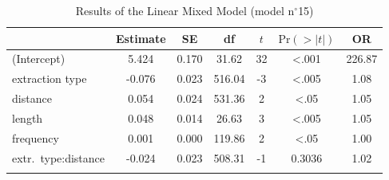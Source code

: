 \begin{table}
\begin{tabularx}{\textwidth}{Q 
                  S[table-format=-1.3] 
                  S[table-format=1.3] 
                  S[table-format=3.2] 
                  S[table-format=-1] 
                  S[table-format=<1.4] 
                  S[table-format=3.2]}
  \lsptoprule
 & {Estimate} & {SE} & {df} & {$t$} & {$\text{Pr}(>|t|)$} & {OR} \\ 
  \midrule
(Intercept) & 5.424 & 0.170 & 31.62 & 32 & <.001 & 226.87 \\ 
  extraction type & -0.076 & 0.023 & 516.04 & -3 & <.005 & 1.08 \\ 
  distance & 0.054 & 0.024 & 531.36 & 2 & <.05 & 1.05 \\ 
  length & 0.048 & 0.014 & 26.63 & 3 & <.005 & 1.05 \\ 
  frequency & 0.001 & 0.000 & 119.86 & 2 & <.05 & 1.00 \\ 
  extr.\ type:distance & -0.024 & 0.023 & 508.31 & -1 & 0.3036 & 1.02 \\ 
   \lspbottomrule
\end{tabularx}
\caption{Results of the Linear Mixed Model (model n$^{\circ}$15)}
\label{tab:exp03-m15}
\end{table}
